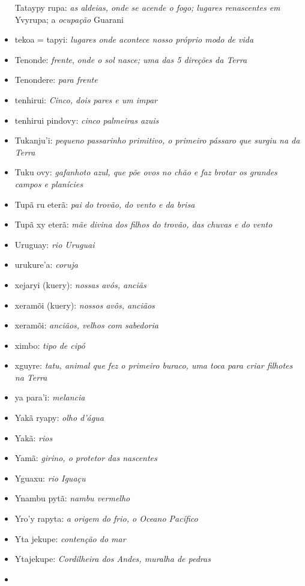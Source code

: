 \begin{itemize}
  Tataypy rupa: \emph{as aldeias, onde se acende o fogo; lugares
  renascentes em} Yvyrupa; a \emph{ocupação} Guarani
\item
  tekoa = tapyi: \emph{lugares onde acontece nosso próprio modo de vida}
\item
  Tenonde: \emph{frente}, \emph{onde o sol nasce; uma das 5 direções da
  Terra}
\item
  Tenondere: \emph{para frente}
\item
  tenhirui: \emph{Cinco, dois pares e um impar}
\item
  tenhirui pindovy: \emph{cinco palmeiras azuis}
\item
  Tukanju'i: \emph{pequeno passarinho primitivo, o primeiro pássaro que
  surgiu na da Terra}
\item
  Tuku ovy: \emph{gafanhoto azul, que põe ovos no chão e faz brotar os
  grandes campos e planícies}
\item
  Tupã ru eterã: \emph{pai do trovão, do vento e da brisa}
\item
  Tupã xy eterã: \emph{mãe divina dos filhos do trovão, das chuvas e do
  vento}
\item
  Uruguay: \emph{rio Uruguai}
\item
  urukure'a: \emph{coruja}
\item
  xejaryi (kuery): \emph{nossas avós, anciãs}
\item
  xeramõi (kuery): \emph{nossos avôs, anciãos}
\item
  xeramõi: \emph{anciãos, velhos com sabedoria}
\item
  ximbo: \emph{tipo de cipó}
\item
  xguyre: \emph{tatu, animal que fez o primeiro buraco, uma toca para
  criar filhotes na Terra}
\item
  ya para'i: \emph{melancia}
\item
  Yakã ryapy: \emph{olho d'água}
\item
  Yakã: \emph{rios}
\item
  Yamã: \emph{girino, o protetor das nascentes}
\item
  Yguaxu: \emph{rio Iguaçu}
\item
  Ynambu pytã: \emph{nambu vermelho}
\item
  Yro'y rapyta: \emph{a origem do frio, o Oceano Pacífico}
\item
  Yta jekupe: \emph{contenção do mar}
\item
  Ytajekupe: \emph{Cordilheira dos Andes, muralha de pedras}
\item

\end{itemize}
